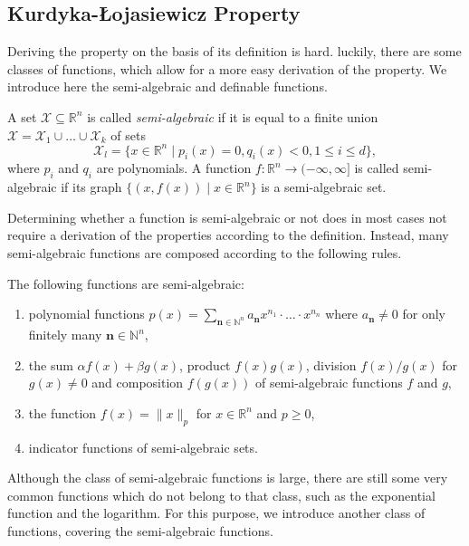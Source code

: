 \subsection{Kurdyka-{\L}ojasiewicz Property}
Deriving the \KL property on the basis of its definition is hard. luckily, there are some classes of functions, which allow for a more easy derivation of the \KL property. We introduce here the semi-algebraic and definable functions. 
\begin{definition}
A set $\mathcal{X}\subseteq \mathbb{R}^n$ is called \emph{semi-algebraic} if it is equal to a finite union $\mathcal{X}=\mathcal{X}_1\cup\ldots\cup\mathcal{X}_k$ of sets
\[\mathcal{X}_l=\{x\in\mathbb{R}^n\mid p_i(x)=0, q_i(x)<0, 1\leq i\leq d\},\]
where $p_i$ and $q_i$ are polynomials.
A function $f:\mathbb{R}^n\rightarrow (-\infty,\infty]$ is called semi-algebraic if its graph $\{(x,f(x))\mid x\in\mathbb{R}^n\}$ is a semi-algebraic set.
\end{definition}
Determining whether a function is semi-algebraic or not does in most cases not require a derivation of the properties according to the definition. Instead, many semi-algebraic functions are composed according to the following rules.
\begin{example}
The following functions are semi-algebraic:
\begin{enumerate}
    \item polynomial functions $p(x)=\sum_{\mathbf{n}\in\mathbb{N}^n}a_\mathbf{n}x^{n_1}\cdot\ldots\cdot x^{n_n}$ where $a_\mathbf{n}\neq 0$ for only finitely many $\mathbf{n}\in\mathbb{N}^n$, 
    \item the sum $\alpha f(x)+\beta g(x)$, product $f(x)g(x)$, division $f(x)/g(x)$ for $g(x)\neq 0$ and composition $f(g(x))$ of semi-algebraic functions $f$ and $g$,
    \item the function $f(x)=\lVert x\rVert _p$ for $x\in\mathbb{R}^n$ and $p\geq 0$,
    \item indicator functions of semi-algebraic sets.
\end{enumerate}
\end{example}
Although the class of semi-algebraic functions is large, there are still some very common functions which do not belong to that class, such as the exponential function and the logarithm. For this purpose, we introduce another class of functions, covering the semi-algebraic functions.
